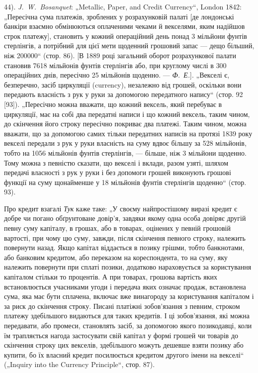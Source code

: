\begin{small}
44). \emph{J.~W.~Bosanquet}: „Metallic, Paper, and Credit Currency“, London 1842: „Пересічна сума платежів,
зроблених у розрахунковій палаті [де лондонські банкіри взаємно обмінюються оплаченими чеками й
векселями, яким надійшов строк платежу], становить у кожний операційний день понад 3 мільйони фунтів
стерлінгів, а потрібний для цієї мети щоденний грошовий запас — дещо більший,
ніж \num{200000}“ (стор. 86). [В 1889 році загальний оборот розрахункової палати
становив 7618 мільйонів фунтів стерлінгів або, при круглому числі в 300 операційних днів,
пересічно 25 мільйонів щоденно. — \emph{Ф.~Е.}]. „Векселі є, безперечно, засіб циркуляції (currency),
незалежно від грошей,
оскільки вони передають власність з рук у руки за допомогою передатного
напису“ (стор. 92 [93]). „Пересічно можна вважати, що кожний вексель,
який перебуває в циркуляції, має на собі два передатні написи і що кожний
вексель, таким чином, до скінчення його строку пересічно покриває два
платежі. Таким чином, можна вважати, що за допомогою самих тільки передатних
написів на протязі 1839 року векселі передали з рук у руки власність
на суму вдвоє більшу за 528 мільйонів, тобто на 1056 мільйонів фунтів стерлінгів,
— більше, ніж 3 мільйони щоденно. Тому можна з певністю сказати, що
векселі і вклади, разом узяті, шляхом передачі власності з рук у руки і без
допомоги грошей виконують грошові функції на суму щонайменше у 18 мільйонів
фунтів стерлінгів щоденно“ (стор. 93).
\enablefootnotebreak{}

Про кредит взагалі \emph{Тук} каже таке: „У своєму найпростішому виразі кредит
є добре чи погано обґрунтоване довір’я, завдяки якому одна особа довіряє
другій певну суму капіталу, в грошах, або в товарах, оцінених у певній грошовій
вартості, при чому цю суму, завжди, після скінчення певного строку, належить
повернути назад. Якщо капітал віддається в позику грішми, тобто банкнотами,
або банковим кредитом, або переказом на кореспондента, то на суму, яку
належить повернути при сплаті позики, додатково нараховується за користування
капіталом стільки то процентів. А при товарах, грошова вартість яких встановлюється
учасниками угоди і передача яких означає продаж, встановлена сума,
яка має бути сплачена, включає вже винагороду за користування капіталом
і за риск до скінчення строку. Писані платіжні зобов’язання з певним, строком
платежу здебільшого видаються для таких кредитів. І ці зобов’язання, які
можна передавати, або промеси, становлять засіб, за допомогою якого позикодавці,
коли їм трапляється нагода застосувати свій капітал у формі грошей чи
товарів до скінчення строку цих векселів, здебільшого можуть дешевше взяти
позику або купити, бо їх власний кредит посилюється кредитом другого імени
на векселі“ („Inquiry into the Currency Principle“, стор. 87).


\end{small}

